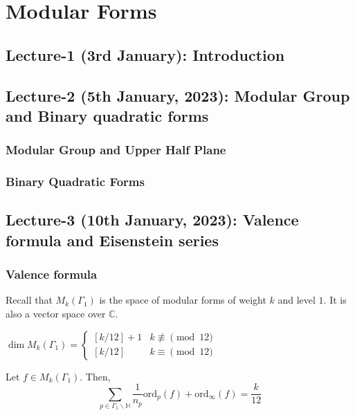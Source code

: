 \documentclass[oneside, 12pt]{scrbook}
\newcommand{\CC}{\mathbb C}
\theoremstyle{theorem}
\begin{document}
\mainmatter

\part{Modular Forms}

\chapter{Lecture-1 (3rd January): Introduction }

\chapter{Lecture-2 (5th January, 2023): Modular Group and Binary quadratic forms}

\section{Modular Group and Upper Half Plane}


\section{Binary Quadratic Forms}

\chapter{Lecture-3 (10th January, 2023): Valence formula and Eisenstein series}

\section{Valence formula}

Recall that $M_{k}(\Gamma_{1})$ is the space of modular forms of weight $k$ and level $1$. It is also a vector space over $\CC$. 

\begin{theorem}
$\dim M_{k}(\Gamma_{1}) = \begin{cases}[k/12]+1 & k\not \equiv \pmod{12} \\ [k/12] & k \equiv \pmod{12} \end{cases}$
\end{theorem}

\begin{proposition}
Let $f \in M_{k}(\Gamma_{1})$. Then, $$\sum_{p \in \Gamma_{1}\backslash \mathbb{H}}\frac{1}{n_{p}} \mathrm{ord}_{p}(f) + \mathrm{ord}_{\infty}(f) = \frac{k}{12}$$
\end{proposition}
\end{document}
